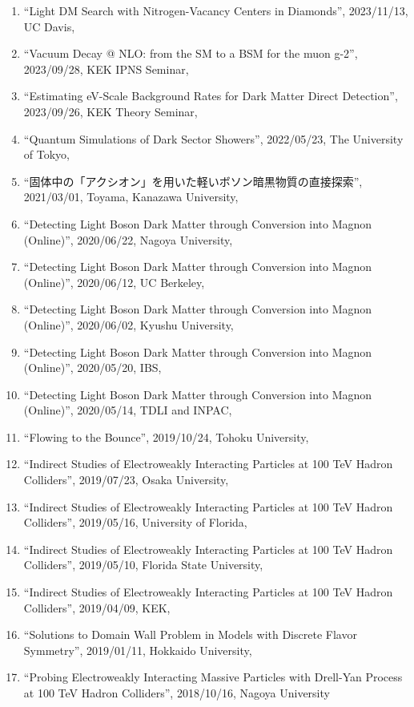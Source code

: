 \documentclass[12pt]{article}
\begin{document}
\begin{enumerate}\item ``Light DM Search with Nitrogen-Vacancy Centers in Diamonds'', 2023/11/13, UC Davis,\item ``Vacuum Decay @ NLO: from the SM to a BSM for the muon g-2'', 2023/09/28, KEK IPNS Seminar,\item ``Estimating eV-Scale Background Rates for Dark Matter Direct Detection'', 2023/09/26, KEK Theory Seminar,\item ``Quantum Simulations of Dark Sector Showers'', 2022/05/23, The University of Tokyo,\item ``固体中の「アクシオン」を用いた軽いボソン暗黒物質の直接探索'', 2021/03/01, Toyama, Kanazawa University,\item ``Detecting Light Boson Dark Matter through Conversion into Magnon (Online)'', 2020/06/22, Nagoya University,\item ``Detecting Light Boson Dark Matter through Conversion into Magnon (Online)'', 2020/06/12, UC Berkeley,\item ``Detecting Light Boson Dark Matter through Conversion into Magnon (Online)'', 2020/06/02, Kyushu University,\item ``Detecting Light Boson Dark Matter through Conversion into Magnon (Online)'', 2020/05/20, IBS,\item ``Detecting Light Boson Dark Matter through Conversion into Magnon (Online)'', 2020/05/14, TDLI and INPAC,\item ``Flowing to the Bounce'', 2019/10/24, Tohoku University,\item ``Indirect Studies of Electroweakly Interacting Particles at 100 TeV Hadron Colliders'', 2019/07/23, Osaka University,\item ``Indirect Studies of Electroweakly Interacting Particles at 100 TeV Hadron Colliders'', 2019/05/16, University of Florida,\item ``Indirect Studies of Electroweakly Interacting Particles at 100 TeV Hadron Colliders'', 2019/05/10, Florida State University,\item ``Indirect Studies of Electroweakly Interacting Particles at 100 TeV Hadron Colliders'', 2019/04/09, KEK,\item ``Solutions to Domain Wall Problem in Models with Discrete Flavor Symmetry'', 2019/01/11, Hokkaido University,\item ``Probing Electroweakly Interacting Massive Particles with Drell-Yan Process at 100 TeV Hadron Colliders'', 2018/10/16, Nagoya University\end{enumerate}
\end{document}
